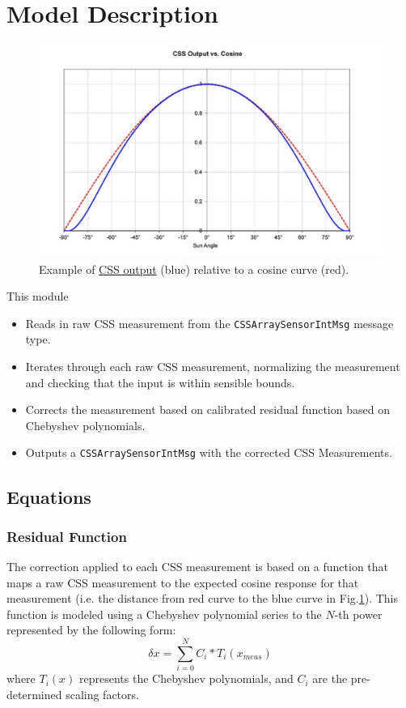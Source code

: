
\section{Model Description}

\begin{figure}[H]
	\centerline{
		\includegraphics[scale=0.5]{Figures/CSSCalibration}
	}
	\caption{Example of \href{https://lang.adcole.com/aerospace/analog-sun-sensors/coarse-sun-sensor-detector/}{CSS output} (blue) relative to a cosine curve (red)\cite{CSS}.}
	\label{fig:CSSraw}
\end{figure}

This module 
\begin{itemize}
\item Reads in raw CSS measurement from the \verb.CSSArraySensorIntMsg. message type.
\item Iterates through each raw CSS measurement, normalizing the measurement and checking that the input is within sensible bounds.
\item Corrects the measurement based on calibrated residual function based on Chebyshev polynomials. 
\item Outputs a \verb.CSSArraySensorIntMsg. with the corrected CSS Measurements.
\end{itemize}


\subsection{Equations}
\subsubsection{Residual Function}
The correction applied to each CSS measurement is based on a function that maps a raw CSS measurement to the expected cosine response for that measurement (i.e. the distance from red curve to the blue curve in Fig.\ref{fig:CSSraw}). This function is modeled using a Chebyshev polynomial series to the $N$-th power represented by the following form: 
\begin{equation}
\delta x = \sum_{i=0}^{N} C_i*T_i(x_{meas})
\end{equation}
 where $T_i(x)$ represents the Chebyshev polynomials, and $C_i$ are the pre-determined scaling factors. 

